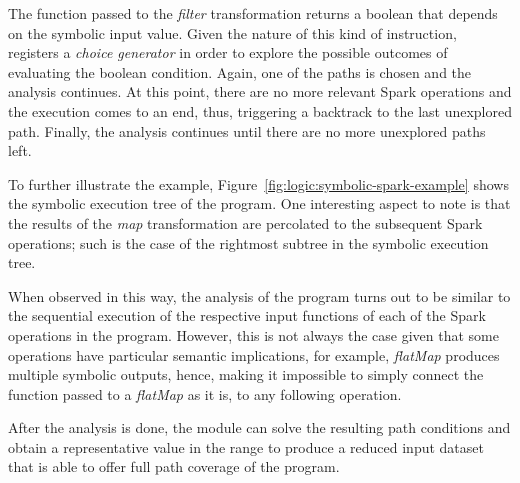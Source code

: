 The function passed to the \textit{filter} transformation returns a boolean that depends on the symbolic input value. Given the nature of this kind of instruction, \spf{} registers a \textit{choice generator} in order to explore the possible outcomes of evaluating the boolean condition. Again, one of the paths is chosen and the analysis continues. At this point, there are no more relevant Spark operations and the execution comes to an end, thus, triggering a backtrack to the last unexplored path. Finally, the analysis continues until there are no more unexplored paths left.

To further illustrate the example, Figure~\ref{fig:logic:symbolic-spark-example} shows the symbolic execution tree of the program. One interesting aspect to note is that the results of the \textit{map} transformation are percolated to the subsequent Spark operations; such is the case of the rightmost subtree in the symbolic execution tree. 

When observed in this way, the analysis of the program turns out to be similar to the sequential execution of the respective input functions of each of the Spark operations in the program. However, this is not always the case given that some operations have particular semantic implications, for example, \textit{flatMap} produces multiple symbolic outputs, hence, making it impossible to simply connect the function passed to a \textit{flatMap} as it is, to any following operation.

After the analysis is done, the module can solve the resulting path conditions and obtain a representative value in the range to produce a reduced input dataset that is able to offer full path coverage of the program.


